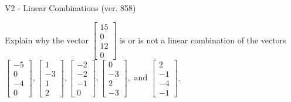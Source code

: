 \begin{exercise}
  \begin{exerciseTitle}V2 - Linear Combinations (ver. 858)\end{exerciseTitle}
  \begin{exerciseStatement}
    Explain why the vector \(\left[\begin{array}{c}
15 \\
0 \\
12 \\
0
\end{array}\right]\)  is or is not a linear 
	combination of the vectors \(\left[\begin{array}{c}
-5 \\
0 \\
-4 \\
0
\end{array}\right] , \left[\begin{array}{c}
1 \\
-3 \\
1 \\
2
\end{array}\right] , \left[\begin{array}{c}
-2 \\
-2 \\
-1 \\
0
\end{array}\right] , \left[\begin{array}{c}
0 \\
-3 \\
2 \\
-3
\end{array}\right] , \text{ and } \left[\begin{array}{c}
2 \\
-1 \\
-4 \\
-1
\end{array}\right]\).
	



\end{exerciseStatement}
\end{exercise}
